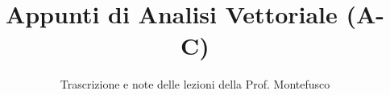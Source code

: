 \documentclass[a4paper,12pt]{article}
\title{Appunti di Analisi Vettoriale (A-C)}
\author{Trascrizione e note delle lezioni della Prof. Montefusco}
\date{}
\begin{document}
\maketitle
\projectintro
\tableofcontents
\newpage

\end{document}
